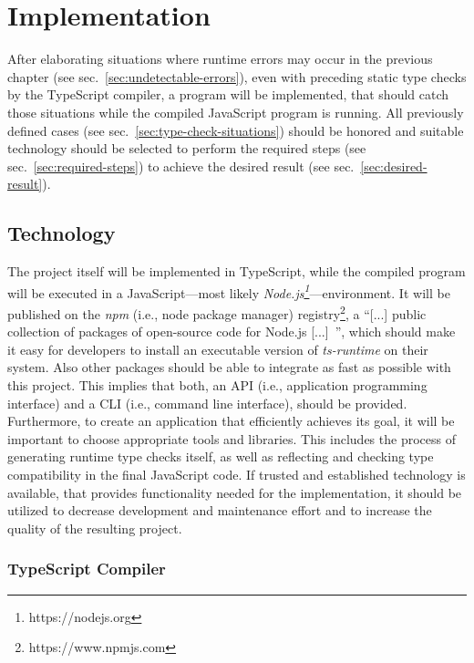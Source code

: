 
\chapter{Implementation}
\label{cha:implementation}

After elaborating situations where runtime errors may occur in the previous chapter (see sec.~\ref{sec:undetectable-errors}), even with preceding static type checks by the TypeScript compiler, a program will be implemented, that should catch those situations while the compiled JavaScript program is running. All previously defined cases (see sec.~\ref{sec:type-check-situations}) should be honored and suitable technology should be selected to perform the required steps (see sec.~\ref{sec:required-steps}) to achieve the desired result (see sec.~\ref{sec:desired-result}).

\section{Technology}
\label{sec:technology}

The project itself will be implemented in TypeScript, while the compiled program will be executed in a JavaScript---most likely \emph{Node.js\footnote{https://nodejs.org}}---environment. It will be published on the \emph{npm} (i.e., node package manager) registry\footnote{https://www.npmjs.com}, a ``[...] public collection of packages of open-source code for Node.js [...]~\cite{npmjs:about}'', which should make it easy for developers to install an executable version of \emph{ts-runtime} on their system. Also other packages should be able to integrate as fast as possible with this project. This implies that both, an API (i.e., application programming interface) and a CLI (i.e., command line interface), should be provided. Furthermore, to create an application that efficiently achieves its goal, it will be important to choose appropriate tools and libraries. This includes the process of generating runtime type checks itself, as well as reflecting and checking type compatibility in the final JavaScript code. If trusted and established technology is available, that provides functionality needed for the implementation, it should be utilized to decrease development and maintenance effort and to increase the quality of the resulting project.

\subsection{TypeScript Compiler}
\label{sec:typescript-compiler}

